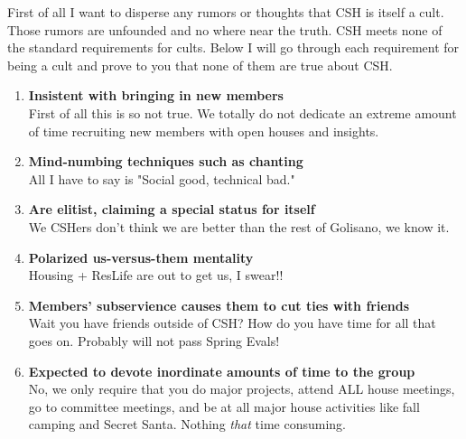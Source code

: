\documentclass[9pt]{extarticle} %
\begin{document}
%
%
\begin{minipage}[t]{.61\linewidth} %
\vspace{-0.4cm}
\hypertarget{firstnews}{}

First of all I want to disperse any rumors or thoughts that CSH is itself a
cult. Those rumors are unfounded and no where near the truth. CSH meets none of
the standard requirements for cults. Below I will go through each requirement 
for being a cult and prove to you that none of them are true about CSH. 
\begin{enumerate}
\item \textbf{Insistent with bringing in new members} \\ 
First of all this is so not true. We totally do not dedicate an extreme 
amount of time recruiting new members with open houses and insights.

\item \textbf{Mind-numbing techniques such as chanting} \\
All I have to say is "Social good, technical bad."

\item \textbf{Are elitist, claiming a special status for itself} \\
We CSHers don't think we are better than the rest of Golisano, we
know it.

\item \textbf{Polarized us-versus-them mentality} \\
Housing + ResLife are out to get us, I swear!!

\item \textbf{Members' subservience causes them to cut ties with friends} \\
Wait you have friends outside of CSH? How do you have time for all that goes on.
Probably will not pass Spring Evals!

\item \textbf{Expected to devote inordinate amounts of time to the group} \\
No, we only require that you do major projects, attend ALL house meetings,
go to committee meetings, and be at all major house activities like fall camping
and Secret Santa. Nothing \textit{that} time consuming.


\end{enumerate}
\end{minipage}
\end{document}
